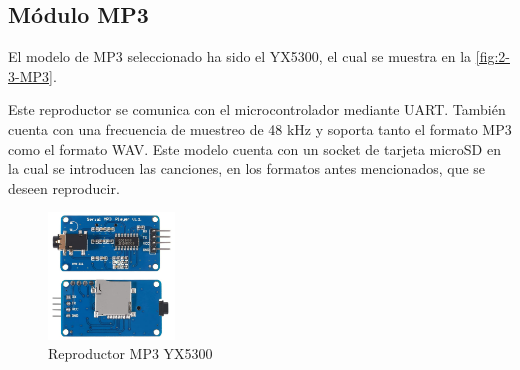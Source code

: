 \subsection{Módulo MP3}
El modelo de MP3 seleccionado ha sido el YX5300, el cual se muestra en la \autoref{fig:2-3-MP3}.

Este reproductor se comunica con el microcontrolador mediante UART. También cuenta con una frecuencia de muestreo de 48 kHz y soporta tanto el formato MP3 como el formato WAV. Este modelo cuenta con un socket de tarjeta microSD en la cual se introducen las canciones, en los formatos antes mencionados, que se deseen reproducir.

\begin{figure}[h]
    \centering
    \includegraphics[width=0.3\textwidth]{images/2/2-4/MP3.jpg}
    \caption{Reproductor MP3 YX5300}
    \label{fig:2-3-MP3}
\end{figure}